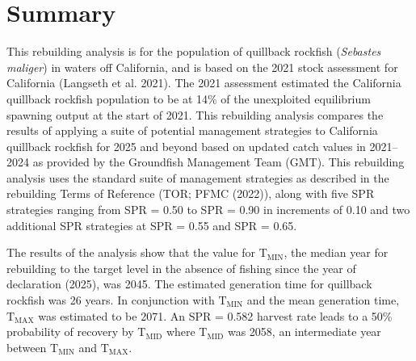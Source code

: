 \documentclass[11pt,
  letterpaper,
]{article}
\begin{document}
\newcommand{\lt}{\ensuremath <}
\newcommand{\gt}{\ensuremath >}

\pagebreak
{}
\setcounter{page}{1}

\renewcommand{\thetable}{\roman{table}}
\renewcommand{\thefigure}{\roman{figure}}

\setlength\parskip{0.5em plus 0.1em minus 0.2em}

\pagebreak

\hypertarget{summary}{%
\section*{Summary}\label{summary}}

This rebuilding analysis is for the population of quillback rockfish (\emph{Sebastes maliger}) in waters off California, and is based on the 2021 stock assessment for California (Langseth et al. 2021). The 2021 assessment estimated the California quillback rockfish population to be at 14\% of the unexploited equilibrium spawning output at the start of 2021. This rebuilding analysis compares the results of applying a suite of potential management strategies to California quillback rockfish for 2025 and beyond based on updated catch values in 2021--2024 as provided by the Groundfish Management Team (GMT). This rebuilding analysis uses the standard suite of management strategies as described in the rebuilding Terms of Reference (TOR; PFMC (2022)), along with five SPR strategies ranging from SPR = 0.50 to SPR = 0.90 in increments of 0.10 and two additional SPR strategies at SPR = 0.55 and SPR = 0.65.

The results of the analysis show that the value for \(\text{T}_\text{MIN}\), the median year for rebuilding to the target level in the absence of fishing since the year of declaration (2025), was 2045. The estimated generation time for quillback rockfish was 26 years. In conjunction with \(\text{T}_\text{MIN}\) and the mean generation time, \(\text{T}_\text{MAX}\) was estimated to be 2071. An SPR = 0.582 harvest rate leads to a 50\% probability of recovery by \(\text{T}_\text{MID}\) where \(\text{T}_\text{MID}\) was 2058, an intermediate year between \(\text{T}_\text{MIN}\) and \(\text{T}_\text{MAX}\).

\pagebreak
\setlength{\parskip}{3mm plus1mm minus1mm}
\setcounter{page}{1}
\renewcommand{\thefigure}{\arabic{figure}}
\renewcommand{\thetable}{\arabic{table}}
\setcounter{table}{0}
\setcounter{figure}{0}
\end{document}
